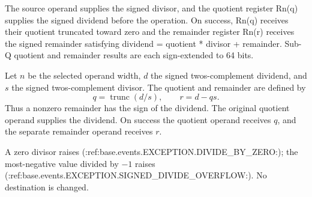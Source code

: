 The source operand supplies the signed divisor, and the quotient register Rn(q) supplies the signed dividend before the operation. On success, Rn(q) receives their quotient truncated toward zero and the remainder register Rn(r) receives the signed remainder satisfying dividend = quotient * divisor + remainder. Sub-Q quotient and remainder results are each sign-extended to 64 bits.


Let \(n\) be the selected operand width, \(d\) the signed two\textquotesingle{}s-complement dividend, and \(s\) the signed two\textquotesingle{}s-complement divisor. The quotient and remainder are defined by
\[
  q = \operatorname{trunc}(d/s),
  \qquad r = d - qs .
\]
Thus a nonzero remainder has the sign of the dividend. The original quotient operand supplies the dividend. On success the quotient operand receives \(q\), and the separate remainder operand receives \(r\).

A zero divisor raises (:ref:base.events.EXCEPTION.DIVIDE_BY_ZERO:); the most-negative value divided by \(-1\) raises (:ref:base.events.EXCEPTION.SIGNED_DIVIDE_OVERFLOW:). No destination is changed.
